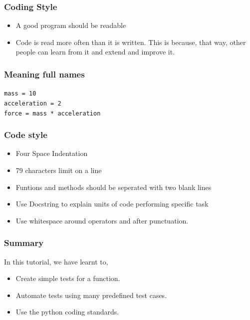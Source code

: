 \documentclass[17pt]{beamer}
\begin{document}
\begin{frame}
	\frametitle{Coding Style}
	
	\begin{itemize}
		\item A good program should be readable\pause
		\item Code is read more often than it is written. This is because, that way, other people can learn from it and extend and improve it. 
	\end{itemize}
\end{frame}
\begin{frame}[fragile]
	\frametitle{Meaning full names}
	
	\texttt{mass = 10}\\
	\texttt{acceleration = 2}\\
	\texttt{force = mass * acceleration}\\
\end{frame}
\begin{frame}
\frametitle{Code style}


\begin{itemize}
\item Four Space Indentation\pause
\item 79 characters limit on a line\pause
\item Funtions and methods should be seperated with two 
   blank lines\pause
\item Use Docstring to explain units of code performing specific task\pause
\item Use whitespace around operators and after punctuation.
\end{itemize}
\end{frame}
\begin{frame}
\frametitle{Summary}
\label{sec-17.1}

 In this tutorial, we have learnt to, 
        
\begin{itemize}
\item Create simple tests for a function.\pause
\item Automate tests using many predefined test cases.\pause
\item Use the python coding standards.
\end{itemize}
\end{frame}
\end{document}
